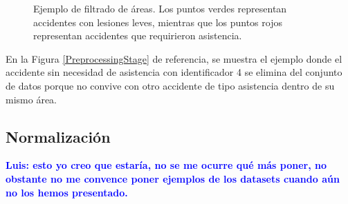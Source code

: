 \documentclass{uathesis-es}
\begin{document}
\begin{figure}[H]
    \centering    

    \label{Areas}
    \caption{Ejemplo de filtrado de áreas. Los puntos verdes representan accidentes con lesiones leves, mientras que los puntos rojos representan accidentes que requirieron asistencia.}
\end{figure}

En la Figura \ref{PreprocessingStage} de referencia, se muestra el ejemplo donde el accidente sin necesidad de asistencia con identificador 4 se elimina del conjunto de datos porque no convive con otro accidente de tipo asistencia dentro de su mismo área.

\subsection{Normalización}

\textcolor{blue}{\textbf{Luis: esto yo creo que estaría, no se me ocurre qué más poner, no obstante no me convence poner ejemplos de los datasets cuando aún no los hemos presentado.}}\\
\end{document}
